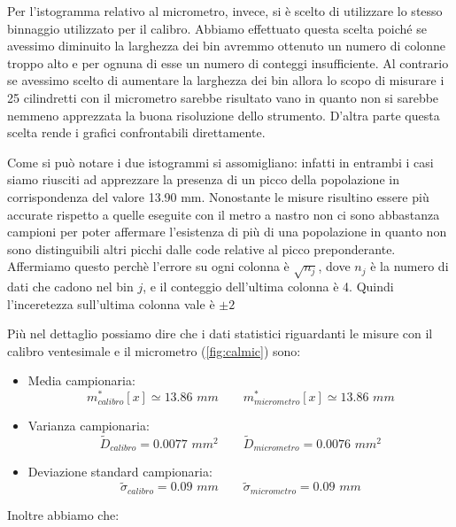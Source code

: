Per l'istogramma relativo al micrometro, invece, si è scelto di utilizzare lo stesso
binnaggio utilizzato per il calibro. Abbiamo effettuato questa scelta poiché se avessimo
diminuito la larghezza dei bin avremmo ottenuto un numero di colonne troppo alto e per
ognuna di esse un numero di conteggi insufficiente. Al contrario se avessimo scelto
di aumentare la larghezza dei bin allora lo scopo di misurare i 25 cilindretti
con il micrometro sarebbe risultato vano in quanto non si sarebbe nemmeno apprezzata
la buona risoluzione dello strumento. D'altra parte questa scelta rende i grafici 
confrontabili direttamente.

Come si può notare i due istogrammi si assomigliano: infatti in entrambi i casi
siamo riusciti ad apprezzare la presenza di un picco della popolazione in
corrispondenza del valore 13.90 mm. Nonostante le misure risultino essere
più accurate rispetto a quelle eseguite con il metro a nastro non ci sono
abbastanza campioni per poter affermare l'esistenza di più di una popolazione
in quanto non sono distinguibili altri picchi dalle code relative al picco preponderante.
Affermiamo questo perchè l'errore su ogni colonna è $\sqrt{n_j}$,
dove $n_j$ è la numero di dati che cadono nel bin $j$, e il conteggio dell'ultima colonna
è 4. Quindi l'inceretezza sull'ultima colonna vale è $\pm 2$

Più nel dettaglio possiamo dire che i dati statistici riguardanti le misure con il calibro ventesimale e il micrometro (\ref{fig:calmic}) sono:

\begin{itemize}
    \item{Media campionaria:}
        \begin{equation}
        m^*_{calibro}[x] \simeq 13.86\,\,mm \qquad
        m^*_{micrometro}[x] \simeq 13.86\,\,mm 
        \end{equation}

    \item{Varianza campionaria:}
        \begin{equation}
        \tilde{D}_{calibro} = 0.0077\,\,mm^2 \qquad
        \tilde{D}_{micrometro} = 0.0076\,\,mm^2
        \end{equation}

    \item{Deviazione standard campionaria:}
        \begin{equation}
        \tilde{\sigma}_{calibro} = 0.09\,\,mm \qquad
        \tilde{\sigma}_{micrometro} = 0.09\,\,mm
        \end{equation}
\end{itemize}
Inoltre abbiamo che:

